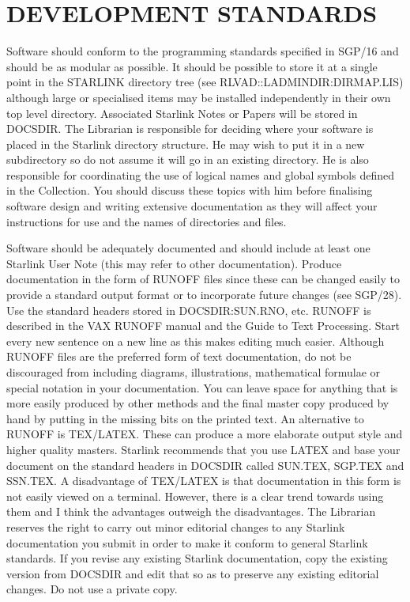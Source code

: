 \section {DEVELOPMENT STANDARDS}
Software should conform to the programming standards specified in SGP/16 and
should be as modular as possible.
It should be possible to store it at a single point in the STARLINK directory
tree (see RLVAD::LADMINDIR:DIRMAP.LIS) although large or specialised items may
be installed independently in their own top level directory.
Associated Starlink Notes or Papers will be stored in DOCSDIR.
The Librarian is responsible for deciding where your software is placed in the
Starlink directory structure.
He may wish to put it in a new subdirectory so do not assume it will go in an
existing directory.
He is also responsible for coordinating the use of logical names and global
symbols defined in the Collection.
You should discuss these topics with him before finalising software design and
writing extensive documentation as they will affect your instructions for use
and the names of directories and files.

Software should be adequately documented and should include at least one
Starlink User Note (this may refer to other documentation).
Produce documentation in the form of RUNOFF files since these can be changed
easily to provide a standard output format or to incorporate future changes
(see SGP/28).
Use the standard headers stored in DOCSDIR:SUN.RNO, etc.
RUNOFF is described in the VAX RUNOFF manual and the Guide to Text Processing.
Start every new sentence on a new line as this makes editing much easier.
Although RUNOFF files are the preferred form of text documentation, do not be
discouraged from including diagrams, illustrations, mathematical formulae or
special notation in your documentation.
You can leave space for anything that is more easily produced by other methods
and the final master copy produced by hand by putting in the missing bits on
the printed text.
An alternative to RUNOFF is TEX/LATEX.
These can produce a more elaborate output style and higher quality masters.
Starlink recommends that you use LATEX and base your document on the standard
headers in DOCSDIR called SUN.TEX, SGP.TEX and SSN.TEX.
A disadvantage of TEX/LATEX is that documentation in this form is not easily
viewed on a terminal.
However, there is a clear trend towards using them and I think the advantages
outweigh the disadvantages.
The Librarian reserves the right to carry out minor editorial changes to any
Starlink documentation you submit in order to make it conform to general
Starlink standards.
If you revise any existing Starlink documentation, copy the existing version
from DOCSDIR and edit that so as to preserve any existing editorial changes.
Do not use a private copy.
